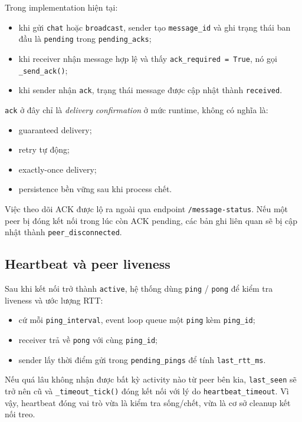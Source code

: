 Trong implementation hiện tại:
\begin{itemize}[leftmargin=2em]
    \item khi gửi \texttt{chat} hoặc \texttt{broadcast}, sender tạo \texttt{message\_id} và ghi trạng thái ban đầu là \texttt{pending} trong \texttt{pending\_acks};
    \item khi receiver nhận message hợp lệ và thấy \texttt{ack\_required = True}, nó gọi \texttt{\_send\_ack()};
    \item khi sender nhận \texttt{ack}, trạng thái message được cập nhật thành \texttt{received}.
\end{itemize}

\texttt{ack} ở đây chỉ là \textit{delivery confirmation} ở mức runtime, không có nghĩa là:
\begin{itemize}[leftmargin=2em]
    \item guaranteed delivery;
    \item retry tự động;
    \item exactly-once delivery;
    \item persistence bền vững sau khi process chết.
\end{itemize}

Việc theo dõi ACK được lộ ra ngoài qua endpoint \texttt{/message-status}. Nếu một peer bị đóng kết nối trong lúc còn ACK pending, các bản ghi liên quan sẽ bị cập nhật thành \texttt{peer\_disconnected}.

\subsection{Heartbeat và peer liveness}
Sau khi kết nối trở thành \texttt{active}, hệ thống dùng \texttt{ping} / \texttt{pong} để kiểm tra liveness và ước lượng RTT:
\begin{itemize}[leftmargin=2em]
    \item cứ mỗi \texttt{ping\_interval}, event loop queue một \texttt{ping} kèm \texttt{ping\_id};
    \item receiver trả về \texttt{pong} với cùng \texttt{ping\_id};
    \item sender lấy thời điểm gửi trong \texttt{pending\_pings} để tính \texttt{last\_rtt\_ms}.
\end{itemize}

Nếu quá lâu không nhận được bất kỳ activity nào từ peer bên kia, \texttt{last\_seen} sẽ trở nên cũ và \texttt{\_timeout\_tick()} đóng kết nối với lý do \texttt{heartbeat\_timeout}. Vì vậy, heartbeat đóng vai trò vừa là kiểm tra sống/chết, vừa là cơ sở cleanup kết nối treo.

